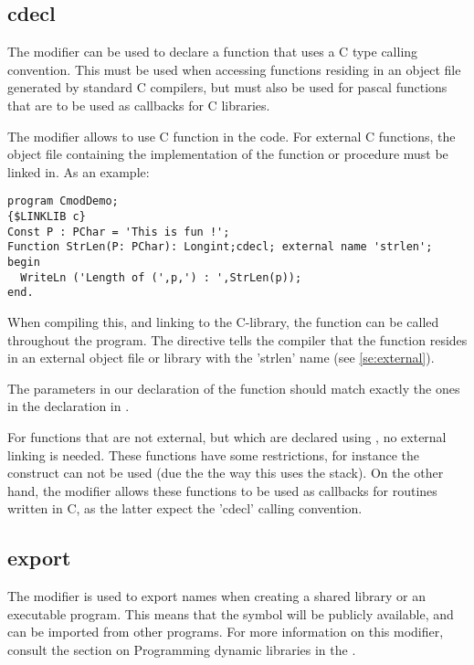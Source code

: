 \subsection{cdecl}
\label{se:cdecl}
The  modifier can be used to declare a function that uses a C
type calling convention. This must be used when accessing functions residing in
an object file generated by standard C compilers, but must also be used for
pascal functions that are to be used as callbacks for C libraries. 

The  modifier allows to use C function in the code. 
For external C functions, the object file containing the  
implementation of the function or procedure must be linked in.
As an example:
\begin{verbatim}
program CmodDemo;
{$LINKLIB c}
Const P : PChar = 'This is fun !';
Function StrLen(P: PChar): Longint;cdecl; external name 'strlen';
begin
  WriteLn ('Length of (',p,') : ',StrLen(p));
end.
\end{verbatim}
When compiling this, and linking to the C-library, the  function
can be called throughout the program. The  directive tells
the compiler that the function resides in an external object file or library
with the 'strlen' name (see \ref{se:external}).
\begin{remark}
The parameters in our declaration of the  function should
match exactly the ones in the declaration in .
\end{remark}

For functions that are not external, but which are declared using
, no external linking is needed. These functions have some
restrictions, for instance the  construct can not be
used (due the the way this uses the stack). On the other hand, the
 modifier allows these functions to be used as callbacks for 
routines written in C, as the latter expect the 'cdecl' calling convention.

\subsection{export}
The  modifier is used to export names when creating a shared library
or an executable program. This means that the symbol will be publicly
available, and can be imported from other programs. For more information
on this modifier, consult the section on Programming dynamic libraries
in the \progref.


